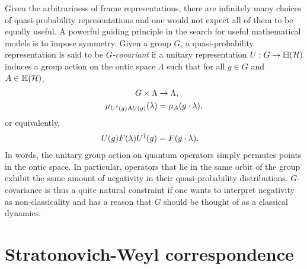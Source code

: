 Given the arbitrariness of frame representations, there are infinitely many choices of quasi-probability representations and one would not expect all of them to be equally useful. A powerful guiding principle in the search for useful mathematical models is to impose symmetry. Given a group $G$, a quasi-probability representation is said to be \emph{$G$-covariant} if a unitary representation $U:G \to \mathbb H(\mathcal{H})$ induces a group action on the ontic space $\Lambda$ such that for all $g \in G$ and $A \in \mathbb H(\mathcal{H})$,
\begin{align}\label{def:covariant}
G \times \Lambda &\to \Lambda, \\
\mu_{\rep\dgg(g) A \rep(g)} (\lambda) &= \mu_A (g \cdot \lambda),
\end{align}
or equivalently,
\begin{align}
U(g) F(\lambda) U^{\dagger}(g) &= F(g\cdot \lambda).
\end{align}
In words, the unitary group action on quantum operators simply permutes points in the ontic space. In particular, operators that lie in the same orbit of the group exhibit the same amount of negativity in their quasi-probability distributions. $G$-covariance is thus a quite natural constraint if one wants to interpret negativity as non-classicality and has a reason that $G$ should be thought of as a classical dynamics.


\section{Stratonovich-Weyl correspondence}\label{ch3:SW}

